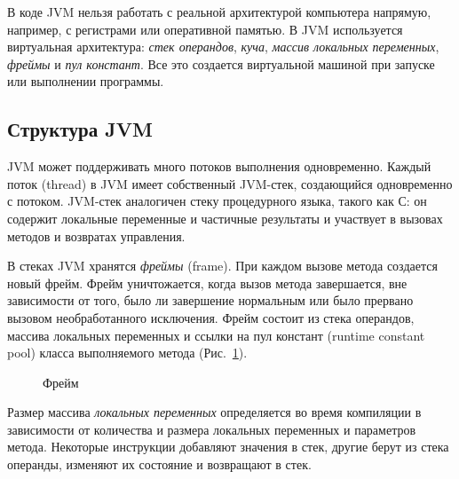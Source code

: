 В коде JVM нельзя работать с реальной архитектурой компьютера напрямую, например, с регистрами или оперативной памятью. В JVM используется 
виртуальная архитектура: \emph{стек операндов}, \emph{куча}, \emph{массив локальных переменных}, \emph{фреймы} и \emph{пул констант}. 
Все это создается виртуальной машиной при запуске или выполнении программы.

\subsection{Структура JVM}

JVM может поддерживать много потоков выполнения одновременно. Каждый поток (thread) в JVM имеет собственный JVM-стек, 
создающийся одновременно с потоком. JVM-стек аналогичен стеку процедурного языка, такого как С: он содержит локальные переменные и 
частичные результаты и участвует в вызовах методов и возвратах управления.  

В стеках JVM хранятся \emph{фреймы} (frame). При каждом вызове метода создается новый фрейм. Фрейм уничтожается, 
когда вызов метода завершается, вне зависимости от того, было ли завершение нормальным или было прервано вызовом 
необработанного исключения. Фрейм состоит из стека операндов, массива локальных переменных и ссылки на пул констант 
(runtime constant pool) класса выполняемого метода (Рис.~\ref{pic_Frame}). 

\begin{figure} [h]
\caption{Фрейм}\label{pic_Frame}
\end{figure}

Размер массива \emph{локальных переменных} определяется во время компиляции в зависимости от количества и размера локальных 
переменных и параметров метода. Некоторые инструкции добавляют значения в стек, другие берут из стека операнды, изменяют 
их состояние и возвращают в стек. 

